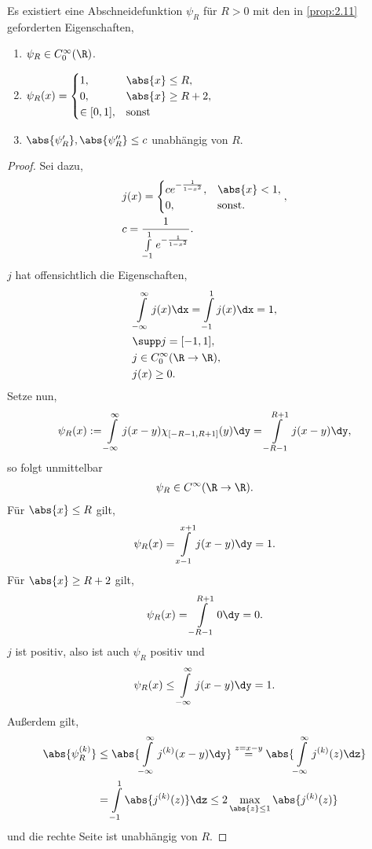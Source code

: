 \begin{prop}[Abschneidefunktion]
\label{prop:2.13}
Es existiert eine Abschneidefunktion $\psi_R$ für $R>0$ mit den in
\ref{prop:2.11} geforderten Eigenschaften,
\begin{enumerate}[label=(\roman{*})]
  \item $\psi_R\in C_0^\infty(\R)$.
  \item $\psi_R(x) = \begin{cases}1, & \abs{x}\le R,\\ 0, & \abs{x}\ge R+2,\\
  \in[0,1], & \text{sonst}\end{cases}$
\item $\abs{\psi_R'}, \abs{\psi_R''} \le c$ unabhängig von $R$.\fishhere
\end{enumerate}
\end{prop}
\begin{proof}
Sei dazu,
\begin{align*}
&j(x) = \begin{cases}
       c e^{-\frac{1}{1-x^2}}, & \abs{x}<1,\\
       0, & \text{sonst}.
       \end{cases},\\
&c = \frac{1}{\int\limits_{-1}^1 e^{-\frac{1}{1-x^2}}}.
\end{align*}
$j$ hat offensichtlich die Eigenschaften,
\begin{align*}
&\int\limits_{-\infty}^\infty j(x)\dx = \int\limits_{-1}^1 j(x)\dx = 1,\\
&\supp j = [-1,1],\\
& j\in C_0^\infty(\R\to\R),\\
& j(x) \ge 0.
\end{align*}
Setze nun,
\begin{align*}
\psi_R(x) := \int\limits_{-\infty}^\infty j(x-y)\chi_{[-R-1,R+1]}(y)\dy
= \int\limits_{-R-1}^{R+1} j(x-y)\dy,
\end{align*}
so folgt unmittelbar
\begin{align*}
\psi_R\in C^\infty(\R\to\R).
\end{align*}
Für $\abs{x}\le R$ gilt,
\begin{align*}
\psi_R(x) = \int\limits_{x-1}^{x+1} j(x-y)\dy = 1.
\end{align*}
Für $\abs{x}\ge R+2$ gilt,
\begin{align*}
\psi_R(x) = \int\limits_{-R-1}^{R+1} 0\dy = 0.
\end{align*}
$j$ ist positiv, also ist auch $\psi_R$ positiv und
\begin{align*}
\psi_R(x) \le \int\limits_{-\infty}^\infty j(x-y)\dy = 1.
\end{align*}
Außerdem gilt,
\begin{align*}
\abs{\psi_R^{(k)}} &\le \abs{\int\limits_{-\infty}^\infty j^{(k)}(x-y)\dy}
\overset{z=x-y}{=} \abs{\int\limits_{-\infty}^\infty j^{(k)}(z)\dz}
\\&= \int\limits_{-1}^1 \abs{j^{(k)}(z)}\dz \le 2\max\limits_{\abs{z}\le 1}
\abs{j^{(k)}(z)}
\end{align*}
und die rechte Seite ist unabhängig von $R$.\qedhere
\end{proof}
